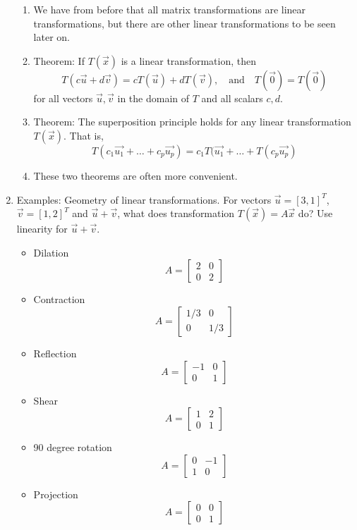 \documentclass{article}
\begin{document}
\begin{enumerate}
\begin{enumerate}
\item We have from before that all matrix transformations are linear transformations, but there are other linear transformations to be seen later on.

\item Theorem: If $T(\vec{x})$ is a linear transformation, then
\[
T(c\vec{u}+d\vec{v}) = cT(\vec{u})+dT(\vec{v}), 
\quad \text{and} \quad 
T(\vec{0}) = T(\vec{0})
\]
for all vectors $\vec{u}, \vec{v}$ in the domain of $T$ and all scalars $c, d$.

\item Theorem: The superposition principle holds for any linear transformation $T(\vec{x})$. That is,
\[
T(c_1 \vec{u_1} + \dots + c_p \vec{u_p}) = 
c_1 T(\vec{u_1} + \dots + T(c_p \vec{u_p})
\]

\item These two theorems are often more convenient.
\end{enumerate}

\item Examples: Geometry of linear transformations. For vectors $\vec{u}=[3,1]^T$, $\vec{v}=[1,2]^T$ and $\vec{u}+\vec{v}$, what does transformation $T(\vec{x})=A\vec{x}$ do? Use linearity for $\vec{u}+\vec{v}$.
\begin{itemize}
\item Dilation 
\[
A = \left[ \begin{array}{cc}
2 & 0 \\
0 & 2
\end{array} \right]
\]
\item Contraction 
\[
A = \left[ \begin{array}{cc}
1/3 & 0 \\
0 & 1/3
\end{array} \right]
\]
\item Reflection 
\[
A = \left[ \begin{array}{cc}
-1 & 0 \\
0 & 1
\end{array} \right]
\]
\item Shear 
\[
A = \left[ \begin{array}{cc}
1 & 2 \\
0 & 1
\end{array} \right]
\]
\item 90 degree rotation 
\[
A = \left[ \begin{array}{cc}
0 & -1 \\
1 & 0
\end{array} \right]
\]
\item Projection
\[
A = \left[ \begin{array}{cc}
0 & 0 \\
0 & 1
\end{array} \right]
\]


\end{itemize}
\end{enumerate}
\end{document}

